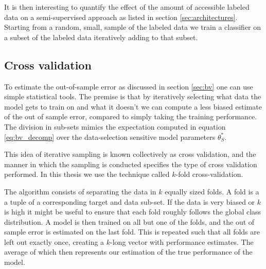 It is then interesting to quantify the effect of the amount of accessible labeled data on a semi-supervised approach as listed in section \ref{sec:architectures}. Starting from a random, small, sample of the labeled data we train a classifier on a subset of the labeled data iteratively adding to that subset. 


\subsection{Cross validation}

To estimate the out-of-sample error as discussed in section \ref{sec:bv} one can use simple statistical tools. The premise is that by iteratively selecting what data the model gets to train on and what it doesn't we can compute a less biased estimate of the out of sample error, compared to simply taking the training performance. The division in sub-sets mimics the expectation computed in equation \ref{eq:bv_decomp} over the data-selection sensitive model parameters $\theta_S^*$. 

This idea of iterative sampling is known collectively as cross validation, and the manner in which the sampling is conducted specifies the type of cross validation performed. In this thesis we use the technique called $k$-fold cross-validation. 

The algorithm consists of separating the data in $k$ equally sized folds. A fold is a a tuple of a corresponding target and data sub-set. If the data is very biased or $k$ is high it might be useful to ensure that each fold roughly follows the global class distribution. A model is then trained on all but one of the folds, and the out of sample error is estimated on the last fold. This is repeated such that all folds are left out exactly once, creating a $k$-long vector with performance estimates. The average of which then represents our estimation of the true performance of the model.